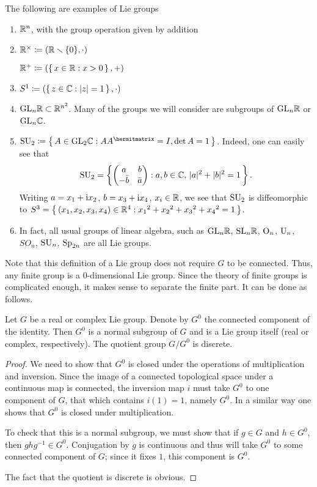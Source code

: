 \begin{example}
  The following are examples of Lie groups
  \begin{enumerate}[label=(\arabic*)]
  \item $\mathbb{R}^n$, with the group operation given by addition
  \item $\mathbb{R}^\times\coloneq(\mathbb{R}\smallsetminus\{0\},\cdot)$

    $\mathbb{R}^+\coloneq(\left\{\,x\in\mathbb{R}:x>0\,\right\},+)$
  \item $S^1\coloneq(\left\{\,z\in\mathbb{C}:|z|=1\,\right\},\cdot)$
  \item $\mathrm{GL}_n\mathbb{R}\subset\mathbb{R}^{n^2}$. Many of the groups we will consider
    are subgroups of $\mathrm{GL}_n\mathbb{R}$ or $\mathrm{GL}_n\mathbb{C}$.
  \item $\SU_2\coloneq\left\{\,A\in\GL_2\bbC:AA^\hermitmatrix=I,\det
      A=1\,\right\}$. Indeed, one can easily see that
    \[
      \mathrm{SU}_2=\left\{
        \begin{pmatrix}
          a&b\\
          -\bar b&\bar a
        \end{pmatrix}:
        a,b\in\mathbb{C},\,|a|^2+|b|^2=1\,
      \right\}.
    \]
    Writing $a=x_1+\mathrm{i} x_2$, $b=x_3+\mathrm{i} x_4$, $x_i\in\mathbb{R}$, we see that
    $\mathrm{SU}_2$ is diffeomorphic to
    $S^3=\left\{\,(x_1,x_2,x_3,x_4)\in\mathbb{R}^4:{x_1}^2+{x_2}^2+{x_3}^2+{x_4}^2=1\,\right\}$.
  \item In fact, all usual groups of linear algebra, such as $\mathrm{GL}_n\mathbb{R}$,
    $\mathrm{SL}_n\mathbb{R}$, $\mathrm{O}_n$, $\mathrm{U}_n$, $SO_n$, $\mathrm{SU}_n$, $\mathrm{Sp}_{2n}$ are all
    Lie groups.
  \end{enumerate}
\end{example}

Note that this definition of a Lie group does not require $G$ to be
connected. Thus, any finite group is a $0$-dimensional Lie group. Since the
theory of finite groups is complicated enough, it makes sense to separate
the finite part. It can be done as follows.

\begin{theorem}
  Let $G$ be a real or complex Lie group. Denote by $G^0$ the connected
  component of the identity. Then $G^0$ is a normal subgroup of $G$ and is
  a Lie group itself (real or complex, respectively). The quotient group
  $G/G^0$ is discrete.
\end{theorem}
\begin{proof}
We need to show that $G^0$ is closed under the operations of multiplication
and inversion. Since the image of a connected topological space under a
continuous map is connected, the inversion map $i$ must take $G^0$ to one
component of $G$, that which contains $i(1)=1$, namely $G^0$. In a similar
way one shows that $G^0$ is closed under multiplication.

To check that this is a normal subgroup, we must show that if $g\in G$ and
$h\in G^0$, then $ghg^{-1}\in G^0$. Conjugation by $g$ is continuous and
thus will take $G^0$ to some connected component of $G$; since it fixes
$1$, this component is $G^0$.

The fact that the quotient is discrete is obvious.
\end{proof}


